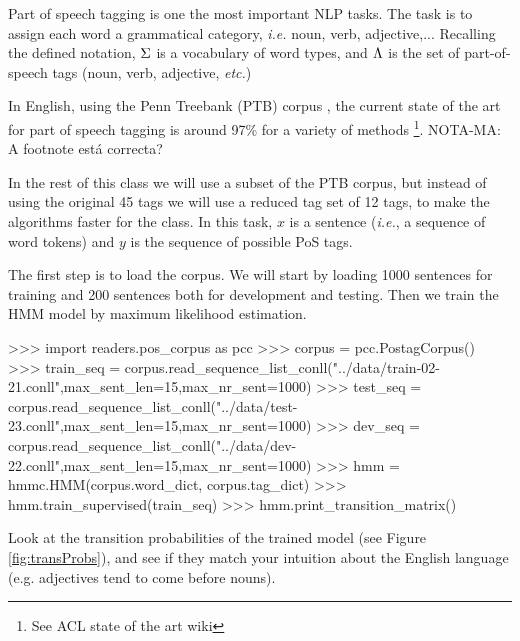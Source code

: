 Part of speech tagging is one the most important NLP tasks. The
task is to assign each word a grammatical category, \emph{i.e.} noun,
verb, adjective,... Recalling the defined notation, $\Sigma$ is a 
vocabulary of word types, and 
$\Lambda$ is the set of part-of-speech tags 
(noun, verb, adjective, \emph{etc.})

In English, using the Penn Treebank (PTB) corpus \citep{pennTreeBank}, the current
state of the art for part of speech tagging is around 97\% for a
variety of methods \footnote{See ACL state of the art wiki}. 
NOTA-MA: A footnote está correcta?

In the rest of this class we will use a subset of the PTB corpus, but
instead of using the original 45 tags we will use a reduced tag set of
12 tags, to make the algorithms faster for the
class. In this task, $x$ is a sentence (\emph{i.e.}, a sequence of word tokens) and $y$
is the sequence of possible PoS tags.

The first step is to load the corpus. We will start by loading
1000 sentences for training and 200 sentences both for development and
testing. Then we train the HMM model by maximum 
likelihood estimation.
\begin{python}
>>> import readers.pos_corpus as pcc
>>> corpus = pcc.PostagCorpus()
>>> train_seq = corpus.read_sequence_list_conll("../data/train-02-21.conll",max_sent_len=15,max_nr_sent=1000)
>>> test_seq = corpus.read_sequence_list_conll("../data/test-23.conll",max_sent_len=15,max_nr_sent=1000)
>>> dev_seq = corpus.read_sequence_list_conll("../data/dev-22.conll",max_sent_len=15,max_nr_sent=1000)
>>> hmm = hmmc.HMM(corpus.word_dict, corpus.tag_dict)
>>> hmm.train_supervised(train_seq)
>>> hmm.print_transition_matrix()
\end{python}


Look at the transition probabilities of the trained model
 (see
Figure \ref{fig:transProbs}), and see if they match your intuition
about the English language (e.g. adjectives tend to come before nouns).

